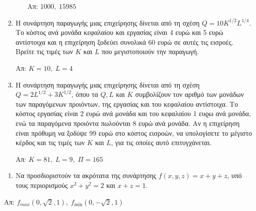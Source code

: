 \begin{enumerate}
\begin{enumerate}[i)]
      \hfill Απ: $1000, \; 15985$
  \end{enumerate}

\item Η συνάρτηση παραγωγής μιας επιχείρησης δίνεται από τη σχέση $ Q=10K^{1/2}L^{1/4}
  $. Το κόστος ανά μονάδα κεφαλαίου και εργασίας είναι 4 ευρώ και 5 ευρώ αντίστοιχα 
  και η επιχείρηση ξοδεύει συνολικά 60 ευρώ σε αυτές τις εισροές. Βρείτε τις τιμές 
  των $K$ και $L$ που μεγιστοποιούν την παραγωγή.

  \hfill Απ: $ K=10, \; L=4 $ 

\item Η συνάρτηση παραγωγής μιας επιχείρησης δίνεται από τη σχέση 
  $ Q=2L^{1/2}+3K^{1/2} $, όπου τα $ Q, L $ και $K$ συμβολίζουν τον αριθμό των 
  μονάδων των παραγόμενων προιόντων, της εργασίας και του κεφαλαίου αντίστοιχα. 
Το κόστος εργασίας είναι 2 ευρώ ανά μονάδα και του κεφαλαίου 1 ευϱω ανά μονάδα, ενώ 
τα παραγόμενα προιόντα πωλούνται 8 ευρώ ανά μονάδα. Αν η επιχείρηση είναι πρόθυμη να 
ξοδύψε 99 ευρώ στο κόστος εισροών, να υπολογίσετε το μέγιστο κέρδος και τις τιμές 
των $K$ και $L$, για τις οποίες αυτό επιτυγχάνεται.

  \hfill Απ: $ K=81, \; L=9, \; \Pi = 165 $ 
\end{enumerate} 


\begin{enumerate}
  \item Να προσδιοριστούν τα ακρότατα της συνάρτησης $ f(x,y,z) = x+y+z $, υπό 
    τους περιορισμούς $ x^{2}+y^{2}=2 $ και $ x+z=1 $.
\end{enumerate}

\hfill Απ: $ f_{max}(0, \sqrt{2} , 1), \; f_{\min}(0, - \sqrt{2} , 1) $ 




